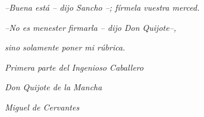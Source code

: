 \vfill%

\hfill \emph{--Buena está -- dijo Sancho --; fírmela vuestra merced.}

\hfill \emph{--No es menester firmarla -- dijo Don Quijote--,}

\hfill \emph{sino solamente poner mi rúbrica.}

\hfill

\hfill \emph{Primera parte del Ingenioso Caballero}

\hfill \emph{Don Quijote de la Mancha}

\hfill \emph{Miguel de Cervantes}

\newpage
\thispagestyle{empty}\mbox{}

\newpage


